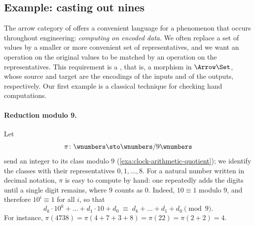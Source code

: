 
\subsection{Example: casting out nines}
\label{sec:arrow-casting-out-nines}

The arrow category of \Set offers a convenient language for a phenomenon that occurs throughout engineering: \emph{computing on encoded data}.
We often replace a set of values by a smaller or more convenient set of representatives, and we want an operation on the original values to be matched by an operation on the representatives.
This requirement is a , that is, a morphism in $\Arrow\Set$, whose source and target are the encodings of the inputs and of the outputs, respectively.
Our first example is a classical technique for checking hand computations.

\paragraph{Reduction modulo 9.}
Let
\begin{equation}
    \pi \colon \wnumbers \sto \wnumbers / 9\wnumbers
\end{equation}
send an integer to its class modulo $9$ (\cref{exa:clock-arithmetic-quotient}); we identify the classes with their representatives $0, 1, \dots, 8$.
For a natural number written in decimal notation, $\pi$ is easy to compute by hand: one repeatedly adds the digits until a single digit remains, where $9$ counts as $0$.
Indeed, $10 \equiv 1$ modulo $9$, and therefore $10^i \equiv 1$ for all $i$, so that
\begin{equation}
    d_k \cdot 10^k + \dots + d_1 \cdot 10 + d_0
    \;\equiv\;
    d_k + \dots + d_1 + d_0
    \pmod{9}.
\end{equation}
For instance, $\pi(4738) = \pi(4 + 7 + 3 + 8) = \pi(22) = \pi(2 + 2) = 4$.

